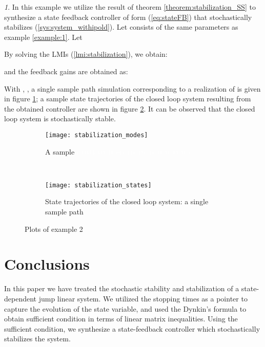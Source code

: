 \documentclass[10.5pt,a4paper]{article}
\theoremstyle{remark}
\newtheorem{example}{\protect\examplename}
\theoremstyle{plain}
\theoremstyle{plain}
\theoremstyle{remark}
\theoremstyle{plain}
\theoremstyle{plain}
\providecommand{\examplename}{Example}
\begin{document}
\begin{example} \label{example:2}
 In this example we utilize the result of theorem
\ref{theorem:stabilization_SS} to synthesize a state feedback controller
of form (\ref{eq:stateFB}) that stochastically stabilizes (\ref{sys:system_withipold}).
Let  consists of the same parameters as
example \ref{example:1}. Let
 
By solving the LMIs (\ref{lmi:stabilization}),
we obtain:

and the feedback gains are obtained as: 
 
 With , , a single sample path simulation corresponding
to a realization of  is given in figure \ref{fig:rt_fb};
a sample state trajectories of the closed loop system resulting from
the obtained controller are shown in figure \ref{fig:states_fb}.
It can be observed that the closed loop system is stochastically stable.




\begin{figure}[h]
\centering
                \begin{subfigure}[b]{0.45\columnwidth}
                \texttt{[image: stabilization\_modes]}
	\caption{A sample  \textcolor{white}{i ttttt ttt tt err rrr rrr rr tt tt tt tt r}	
			}
               \label{fig:rt_fb} 
        \end{subfigure}~ \begin{subfigure}[b]{0.45\columnwidth}
                \texttt{[image: stabilization\_states]}
	\caption{State trajectories of the closed loop system: a single sample path }
                \label{fig:states_fb}
        \end{subfigure}
\caption{Plots of example 2 }\label{fig:example2}
\end{figure}
\end{example} 

\section{Conclusions}\label{section:conclusions}
 In this paper we have treated the stochastic
stability and stabilization of a state-dependent jump linear system.
We utilized the stopping times as a pointer to capture the evolution
of the state variable, and used the Dynkin's formula to obtain sufficient
condition in terms of linear matrix inequalities. Using the sufficient
condition, we synthesize a state-feedback controller which stochastically
stabilizes the system. 
\end{document}
